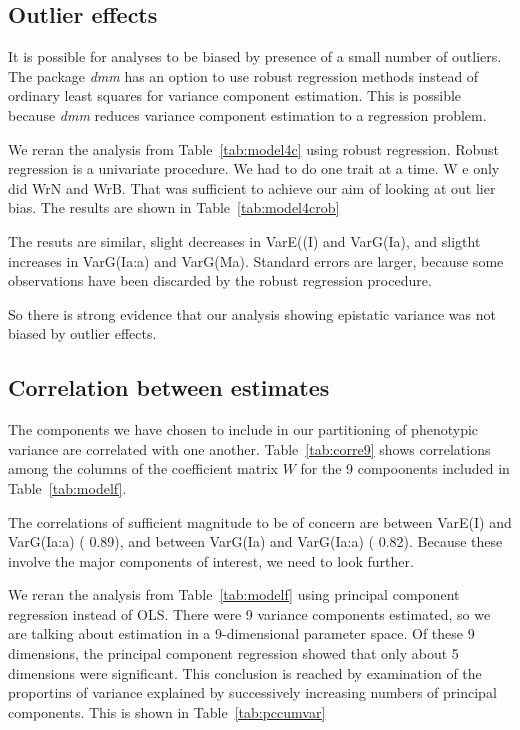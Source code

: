 \documentclass[titlepage]{article}  %
\begin{document}
\subsection{Outlier effects}
It is possible for analyses to be biased by presence of a small number of outliers. The package {\em dmm} has an option to use robust regression methods instead of ordinary least squares for variance component estimation. This is possible because {\em dmm} reduces variance component estimation to a regression problem.

We reran the analysis from Table~\ref{tab:model4c}  using robust regression. Robust regression is a univariate procedure. We had to do one trait at a time. W
e only did WrN and WrB. That was sufficient to achieve our aim of looking at out
lier bias. The results are shown in Table~\ref{tab:model4crob}

The resuts are similar, slight decreases in VarE((I) and VarG(Ia), and sligtht increases in VarG(Ia:a) and VarG(Ma). Standard errors are larger, because some observations have been discarded by the robust regression procedure. 

So there is strong evidence that our analysis showing epistatic variance was not  biased by outlier effects. 

\subsection{Correlation between estimates}
The components we have chosen to include in our partitioning of phenotypic variance are correlated with one another. Table~\ref{tab:corre9} shows correlations among the columns of the coefficient matrix $W$ for the 9 compoonents included in Table~\ref{tab:modelf}.

The correlations of sufficient magnitude to be of concern are between VarE(I) and VarG(Ia:a) ( 0.89), and between VarG(Ia) and VarG(Ia:a) ( 0.82). Because these involve the major components of interest, we need to look further. 

We reran the analysis from Table~\ref{tab:modelf} using principal component regression instead of OLS. There were 9 variance components estimated, so we are talking about estimation in a 9-dimensional parameter space. Of these 9 dimensions, the principal component regression showed that only about 5 dimensions were significant. This conclusion is reached by examination of the proportins of variance explained by successively increasing numbers of principal components. This is shown in Table~\ref{tab:pccumvar}

\end{document}
